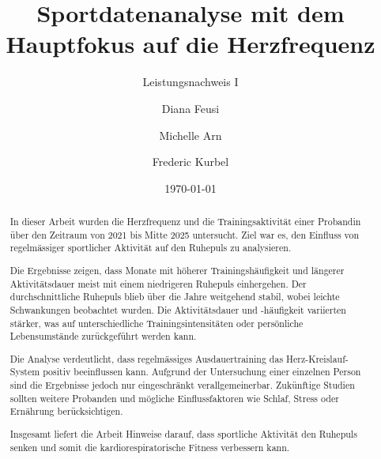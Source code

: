 

\titlehead{BSc Computational and Data Science\\CDS Data Scinece\\Dozent: Prof. Corsin Capol\hfill}
\title{Sportdatenanalyse mit dem Hauptfokus auf die Herzfrequenz}
\subtitle{Leistungsnachweis I}
\author[1,*]{Diana Feusi}
\author[1,*]{Michelle Arn}
\author[1,*]{Frederic Kurbel}
\date{\today}
\maketitle

\begin{abstract}
In dieser Arbeit wurden die Herzfrequenz und die Trainingsaktivität einer Probandin über den Zeitraum von 2021 bis Mitte 2025 untersucht. Ziel war es, den Einfluss von regelmässiger sportlicher Aktivität auf den Ruhepuls zu analysieren.

Die Ergebnisse zeigen, dass Monate mit höherer Trainingshäufigkeit und längerer Aktivitätsdauer meist mit einem niedrigeren Ruhepuls einhergehen. Der durchschnittliche Ruhepuls blieb über die Jahre weitgehend stabil, wobei leichte Schwankungen beobachtet wurden. Die Aktivitätsdauer und -häufigkeit variierten stärker, was auf unterschiedliche Trainingsintensitäten oder persönliche Lebensumstände zurückgeführt werden kann.

Die Analyse verdeutlicht, dass regelmässiges Ausdauertraining das Herz-Kreislauf-System positiv beeinflussen kann. Aufgrund der Untersuchung einer einzelnen Person sind die Ergebnisse jedoch nur eingeschränkt verallgemeinerbar. Zukünftige Studien sollten weitere Probanden und mögliche Einflussfaktoren wie Schlaf, Stress oder Ernährung berücksichtigen.

Insgesamt liefert die Arbeit Hinweise darauf, dass sportliche Aktivität den Ruhepuls senken und somit die kardiorespiratorische Fitness verbessern kann.
\end{abstract}
